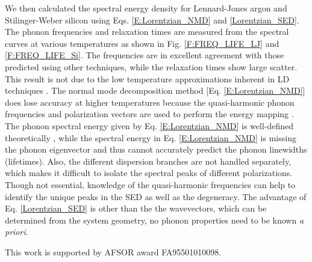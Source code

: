 \documentclass[twocolumn,10pt]{asme2e}
\begin{document}
We then calculated the spectral energy density for Lennard-Jones argon and Stilinger-Weber silicon using Eqs$.$ \eqref{E:Lorentzian_NMD} and \eqref{Lorentzian_SED}. The phonon frequencies and
relaxation times are measured from the spectral curves at various temperatures as shown in Fig$.$ \ref{F:FREQ_LIFE_LJ} and \ref{F:FREQ_LIFE_Si}. The
frequencies are in excellent agreement with those predicted using other
techniques, while the relaxation times show large scatter. This result is not due to the low temperature approximations inherent in LD techniques
\cite{turney2009a}.  The normal mode decomposition method [Eq$.$ \eqref{E:Lorentzian_NMD}]  does lose accuracy
at higher temperatures because the quasi-harmonic phonon frequencies and
polarization vectors are used to perform the energy mapping
\cite{turney2009a}. The phonon spectral energy given by Eq$.$ \eqref{E:Lorentzian_NMD} is well-defined theoretically \cite{wallace1972}, while the spectral energy in Eq$.$ \eqref{E:Lorentzian_NMD} is missing the phonon eigenvector and thus cannot accurately predict the phonon linewidths (lifetimes). Also, the different dispersion branches are not handled
separately, which makes it difficult to isolate the spectral peaks of different polarizations. Though not essential, knowledge of the quasi-harmonic frequencies can help to identify
the unique peaks in the SED as well as the degeneracy. The advantage of Eq$.$ \eqref{Lorentzian_SED} is other than the the wavevectors, which can be determined from the system geometry, no phonon
properties need to be known {\em a priori}.

\begin{acknowledgment}
This work is supported by AFSOR award FA95501010098.
\end{acknowledgment}





\end{document}

